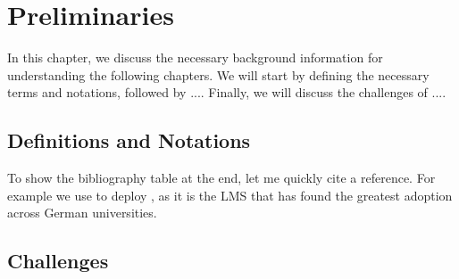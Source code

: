 \documentclass[../thesis.tex]{subfiles}
\begin{document}
    \chapter{Preliminaries}\label{ch:preliminaries}
    In this chapter, we discuss the necessary background information for understanding the following chapters. We will start by defining the necessary terms and notations, followed by .... Finally, we will discuss the challenges of ....
    \lipsum[1-2]
    \section{Definitions and Notations}
    To show the bibliography table at the end, let me quickly cite a reference. For example we use \cite{docker} to deploy \cite{moodle}, as it is the LMS that has found the greatest adoption across German universities\cite{statisa-LMS-market-share-germany-2024}.

    \section{Challenges}


    \ifSubfilesClassLoaded{%
        \printbibliography{}%
    }{}
\end{document}
